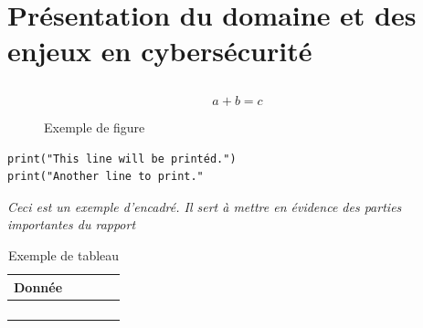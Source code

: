 \chapter{Présentation du domaine et des enjeux en cybersécurité}
    \section{}
        \subsection{}
            \subsubsection{}
                \begin{equation}\label{eq:Eq1}
                    a+b = c
                \end{equation}
                \begin{figure}[htp]
                    \centering
                    {}
                    \caption{Exemple de figure}
                \end{figure}
                \begin{lstlisting}[caption={Un code Python}]
print("This line will be printéd.")
print("Another line to print."\end{lstlisting}
                \begin{tcolorbox}[colback=linkborder_Color!5!white,colframe=linkborder_Color!75!black]
                    \textit{Ceci est un exemple d'encadré. Il sert à mettre en évidence des parties importantes du rapport}
                \end{tcolorbox}
                \begin{table}[H]
                    \centering
                    \begin{tabular}{lcccc}
                        \toprule
                        \textbf{Donnée} & \textbf{} & \textbf{} & \textbf{} & \textbf{} \\
                        \midrule
                         &  &  &  &  \\
                         &  &  &  &  \\
                         &  &  &  &  \\
                         &  &  &  &  \\
                        \bottomrule
                    \end{tabular}
                    \caption{Exemple de tableau}
                \end{table}
